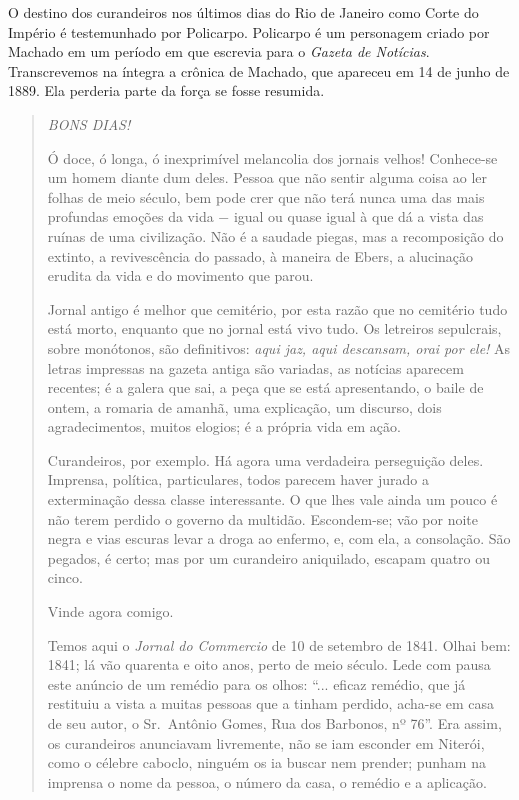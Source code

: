 O destino dos curandeiros nos últimos dias do Rio de Janeiro como Corte
do Império é testemunhado por Policarpo. Policarpo é um personagem
criado por Machado em um período em que escrevia para o \emph{Gazeta de
Notícias}. Transcrevemos na íntegra a crônica de Machado, que apareceu
em 14 de junho de 1889. Ela perderia parte da força se fosse resumida.

\begin{quote}
\emph{BONS DIAS!}

Ó doce, ó longa, ó inexprimível melancolia dos jornais velhos!
Conhece-se um homem diante dum deles. Pessoa que não sentir alguma coisa
ao ler folhas de meio século, bem pode crer que não terá nunca uma das
mais profundas emoções da vida − igual ou quase igual à que dá a vista
das ruínas de uma civilização. Não é a saudade piegas, mas a
recomposição do extinto, a revivescência do passado, à maneira de Ebers,
a alucinação erudita da vida e do movimento que parou.

Jornal antigo é melhor que cemitério, por esta razão que no cemitério
tudo está morto, enquanto que no jornal está vivo tudo. Os letreiros
sepulcrais, sobre monótonos, são definitivos: \emph{aqui jaz, aqui
descansam, orai por ele!} As letras impressas na gazeta antiga são
variadas, as notícias aparecem recentes; é a galera que sai, a peça que
se está apresentando, o baile de ontem, a romaria de amanhã, uma
explicação, um discurso, dois agradecimentos, muitos elogios; é a
própria vida em ação.

Curandeiros, por exemplo. Há agora uma verdadeira perseguição deles.
Imprensa, política, particulares, todos parecem haver jurado a
exterminação dessa classe interessante. O que lhes vale ainda um pouco é
não terem perdido o governo da multidão. Escondem-se; vão por noite
negra e vias escuras levar a droga ao enfermo, e, com ela, a consolação.
São pegados, é certo; mas por um curandeiro aniquilado, escapam quatro
ou cinco.

Vinde agora comigo.

Temos aqui o \emph{Jornal do Commercio} de 10 de setembro de 1841. Olhai
bem: 1841; lá vão quarenta e oito anos, perto de meio século. Lede com
pausa este anúncio de um remédio para os olhos: ``... eficaz remédio,
que já restituiu a vista a muitas pessoas que a tinham perdido, acha-se
em casa de seu autor, o Sr.~Antônio Gomes, Rua dos Barbonos, nº 76''.
Era assim, os curandeiros anunciavam livremente, não se iam esconder em
Niterói, como o célebre caboclo, ninguém os ia buscar nem prender;
punham na imprensa o nome da pessoa, o número da casa, o remédio e a
aplicação.


\end{quote}
